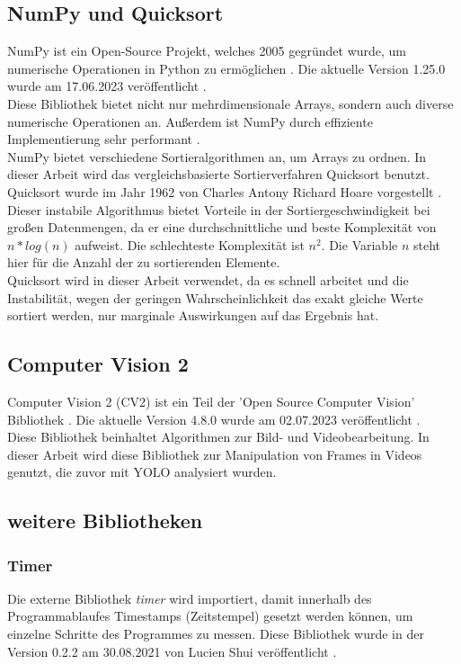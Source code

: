 		\subsection{NumPy und Quicksort}
		{ \label{subsec:NumPy}
		NumPy ist ein Open-Source Projekt, welches 2005 gegründet wurde, um numerische Operationen in Python zu ermöglichen \citep{numpy_about}. Die aktuelle Version 1.25.0 wurde am 17.06.2023 veröffentlicht \citep{numpy_main_web}. \\
		Diese Bibliothek bietet nicht nur mehrdimensionale Arrays, sondern auch diverse numerische Operationen an. Außerdem ist NumPy durch effiziente Implementierung sehr performant \citep{numpy_main_web}. \\

		NumPy bietet verschiedene Sortieralgorithmen an, um Arrays zu ordnen. In dieser Arbeit wird das vergleichsbasierte Sortierverfahren \glqq Quicksort\grqq{} benutzt. \\
		Quicksort wurde im Jahr 1962 von Charles Antony Richard Hoare vorgestellt \citep{Hoare1962QS}. Dieser instabile Algorithmus bietet Vorteile in der Sortiergeschwindigkeit bei großen Datenmengen, da er eine durchschnittliche und beste Komplexität von $n*log(n)$ aufweist. Die schlechteste Komplexität ist $n^2$. Die Variable $n$ steht hier für die Anzahl der zu sortierenden Elemente. \\
		Quicksort wird in dieser Arbeit verwendet, da es schnell arbeitet und die Instabilität, wegen der geringen Wahrscheinlichkeit das exakt gleiche Werte sortiert werden, nur marginale Auswirkungen auf das Ergebnis hat.
		}

		\subsection{Computer Vision 2}
		{ \label{subsec:Computer_Vision_2}
		Computer Vision 2 (CV2) ist ein Teil der 'Open Source Computer Vision' Bibliothek \citep{opencv_about}. Die aktuelle Version 4.8.0 wurde am 02.07.2023 veröffentlicht \citep{opencv_release}. \\
		Diese Bibliothek beinhaltet Algorithmen zur Bild- und Videobearbeitung. In dieser Arbeit wird diese Bibliothek zur Manipulation von Frames in Videos genutzt, die zuvor mit YOLO analysiert wurden. 
		}
		\subsection{weitere Bibliotheken}
		\subsubsection*{Timer}	
		{Die externe Bibliothek \textit{timer} wird importiert, damit innerhalb des Programmablaufes Timestamps (Zeitstempel) gesetzt werden können, um einzelne Schritte des Programmes zu messen. Diese Bibliothek wurde in der Version 0.2.2 am 30.08.2021 von Lucien Shui veröffentlicht \citep{Shui2021}. }

